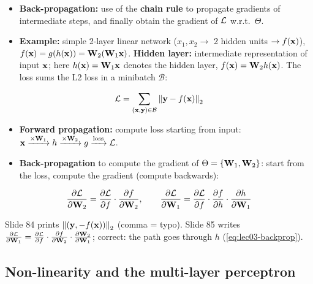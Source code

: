 \begin{itemize}
  \item \textbf{Back-propagation:} use of the \textbf{chain rule} to propagate
    gradients of intermediate steps, and finally obtain the gradient of $\mathcal{L}$
    w.r.t.\ $\Theta$.
  \item \textbf{Example:} simple 2-layer linear network ($x_1,x_2\to$ 2 hidden
    units $\to f(\mathbf{x})$), $f(\mathbf{x})=g(h(\mathbf{x}))=\mathbf{W}_2(\mathbf{W}_1\mathbf{x})$. \textbf{Hidden
    layer:} intermediate representation of input $\mathbf{x}$; here $h(\mathbf{x})=\mathbf{W}_1\mathbf{x}$
    denotes the hidden layer, $f(\mathbf{x})=\mathbf{W}_2h(\mathbf{x})$. The loss sums the L2 loss
    in a minibatch $\mathcal{B}$:
\end{itemize}
\begin{equation}\label{eq:lec03-bp-loss}
  \mathcal{L} = \sum_{(\mathbf{x},\mathbf{y})\in\mathcal{B}}\left\lVert \mathbf{y}-f(\mathbf{x}) \right\rVert_2
\end{equation}
\begin{itemize}
  \item \textbf{Forward propagation:} compute loss starting from input:
    $\mathbf{x} \xrightarrow{\times\mathbf{W}_1} h \xrightarrow{\times\mathbf{W}_2} g \xrightarrow{\text{loss}}\mathcal{L}$.
  \item \textbf{Back-propagation} to compute the gradient of
    $\Theta=\{\mathbf{W}_1,\mathbf{W}_2\}$: start from the loss, compute the gradient
    (compute backwards):
\end{itemize}
\begin{equation}\label{eq:lec03-backprop}
  \frac{\partial\mathcal{L}}{\partial\mathbf{W}_2} = \frac{\partial\mathcal{L}}{\partial f}\cdot\frac{\partial f}{\partial\mathbf{W}_2},
  \qquad
  \frac{\partial\mathcal{L}}{\partial\mathbf{W}_1} = \frac{\partial\mathcal{L}}{\partial f}\cdot\frac{\partial f}{\partial h}\cdot\frac{\partial h}{\partial\mathbf{W}_1}
\end{equation}
\begin{caution}
  Slide 84 prints $\left\lVert (\mathbf{y},-f(\mathbf{x})) \right\rVert_2$ (comma = typo). Slide 85 writes
  $\frac{\partial\mathcal{L}}{\partial\mathbf{W}_1}=\frac{\partial\mathcal{L}}{\partial f}\cdot\frac{\partial f}{\partial\mathbf{W}_2}\cdot\frac{\partial\mathbf{W}_2}{\partial\mathbf{W}_1}$;
  correct: the path goes through $h$ (\cref{eq:lec03-backprop}).
\end{caution}

\subsection{Non-linearity and the multi-layer perceptron}\label{sec:lec03-mlp}


